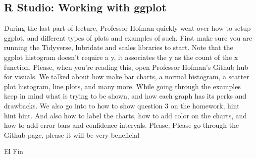 \subsection{R Studio: Working with ggplot}
During the last part of lecture, Professor Hofman quickly went over how to setup ggplot, and different types of plots and examples of such. First make sure you are running the Tidyverse, lubridate and scales libraries to start. Note that the ggplot histogram doesn't require a y, it associates the y as the count of the x function. Please, when you're reading this, open Professor Hofman's Github hub for visuals. We talked about how make bar charts, a normal histogram, a scatter plot histogram, line plots, and many more. While going through the examples keep in mind what is trying to be shown, and how each graph has its perks and drawbacks. We also go into to how to show question 3 on the homework, hint hint hint. And also how to label the charts, how to add color on the charts, and how to add error bars and confidence intervals. Please, Please go through the Github page, please it will be very beneficial



El Fin

   

